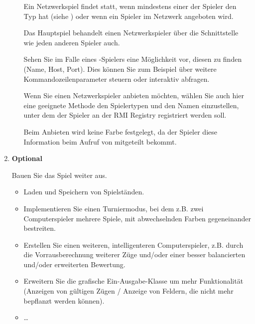 \begin{enumerate}
\begin{enumerate}
Ein Netzwerkspiel findet statt, wenn mindestens einer der Spieler den Typ  hat (siehe ) oder wenn ein Spieler im Netzwerk angeboten wird.

Das Hauptspiel behandelt einen Netzwerkspieler über die Schnittstelle\\  wie jeden anderen Spieler auch.

Sehen Sie im Falle eines -Spielers eine Möglichkeit vor, diesen zu finden (Name, Host, Port). Dies können Sie zum Beispiel über weitere Kommandozeilenparameter steuern oder interaktiv abfragen.

Wenn Sie einen Netzwerkspieler anbieten möchten, wählen Sie auch hier eine geeignete Methode den Spielertypen und den Namen einzustellen, unter dem der Spieler an der RMI Registry registriert werden soll.

Beim Anbieten wird keine Farbe festgelegt, da der Spieler diese Information beim Aufruf von  mitgeteilt bekommt.

\end{enumerate}

\pagebreak
\item \textbf{Optional} 

Bauen Sie das Spiel weiter aus.
\begin{itemize}
\item Laden und Speichern von Spielständen.
\item 
Implementieren Sie einen Turniermodus, 
bei dem z.B. zwei Computerspieler mehrere 
Spiele, mit abwechselnden Farben gegeneinander bestreiten.
\item Erstellen Sie einen weiteren, intelligenteren Computerspieler, z.B. durch die Vorrausberechnung weiterer Züge und/oder einer besser balancierten und/oder erweiterten Bewertung.
\item Erweitern Sie die grafische Ein-Ausgabe-Klasse um mehr Funktionalität (Anzeigen von gültigen Zügen / Anzeige von Feldern, die nicht mehr bepflanzt werden können).
\item \dots
\end{itemize}
\end{enumerate}

